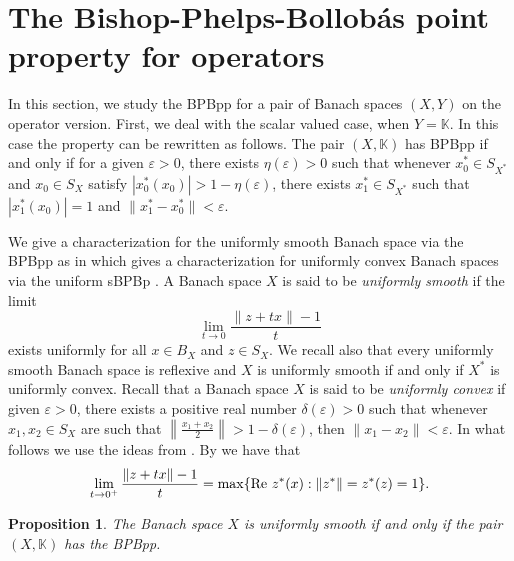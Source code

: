 \documentclass[12pt,a4paper]{amsart}
\newtheorem{proposition}[theorem]{Proposition}
\theoremstyle{definition}
\newcommand{\e}{\varepsilon}
\DeclareMathOperator{\re}{Re}
\numberwithin{equation}{section}
\newcommand{\K}{\mathbb{K}} %
\def\K{{\mathbb K}}
\def\re{\hbox{\rm Re~}}
\begin{document}
\section{The Bishop-Phelps-Bollob\'as point property for operators}


In this section, we study the BPBpp for a pair of Banach spaces $(X, Y)$ on the operator version. First, we deal with the scalar valued case, when $Y = \K$. In this case the property can be rewritten as follows. The pair $(X, \K)$ has BPBpp if and only if for a given $\e > 0$, there exists $\eta(\e) > 0$ such that whenever $x_0^* \in S_{X^*}$ and $x_0 \in S_X$ satisfy $|x_0^*(x_0)| > 1 - \eta(\e)$, there exists $x_1^* \in S_{X^*}$ such that $|x_1^*(x_0)| = 1$ and $\|x_1^* - x_0^*\| < \e$.


 We give a characterization for the uniformly smooth Banach space via the BPBpp as in \cite[Theorem 2.1]{KL} which gives a characterization for uniformly convex Banach spaces via the uniform sBPBp \cite[Definition 3]{Dantas}. A Banach space $X$ is said to be {\it uniformly smooth} if the limit
\begin{equation}
\lim_{t \rightarrow 0} \frac{\|z + tx\| - 1}{t}
\label{us1}
\end{equation}
exists uniformly for all $x \in B_X$ and $z \in S_X$. We recall also that every uniformly smooth Banach space is reflexive and $X$ is uniformly smooth if and only if $X^*$ is uniformly convex. Recall that  a Banach space $X$ is said to be {\it uniformly convex} if given $\e > 0$, there exists a positive real number $\delta(\e) > 0$ such that whenever $x_1, x_2 \in S_X$ are such that $\left\| \frac{x_1 + x_2}{2} \right\| > 1 - \delta(\e)$, then $\|x_1 - x_2\| < \e$. In what follows we use the ideas from \cite[Proposition 4.10]{MMP}. By \cite[Theorem V.9.5, p. 447]{DS} we have that
\begin{equation}
\lim_{t \rightarrow 0^+} \frac{ \|z + tx\| - 1}{t} = \max \{ \re z^*(x): \|z^*\| = z^*(z) = 1 \}.
\label{us2}
\end{equation}


\begin{proposition} The Banach space $X$ is uniformly smooth if and only if the pair $(X, \K)$ has the BPBpp.
\label{DKL1}
\end{proposition}
\end{document}
